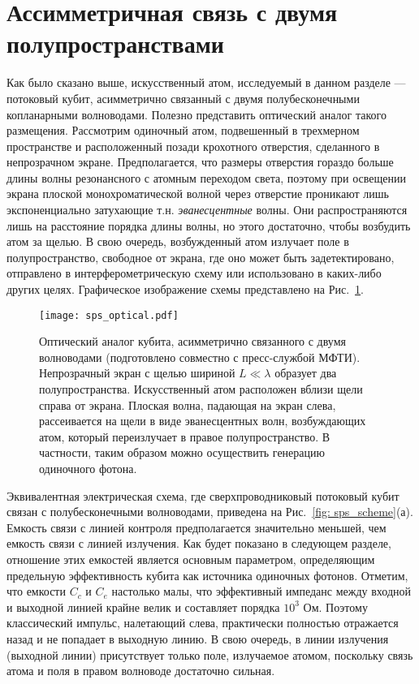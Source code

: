 \section{Ассимметричная связь с двумя полупространствами}
Как было сказано выше, искусственный атом, исследуемый в данном разделе --- потоковый кубит, асимметрично связанный с двумя полубесконечными копланарными волноводами. Полезно представить оптический аналог такого размещения. Рассмотрим одиночный атом, подвешенный в трехмерном пространстве и расположенный позади крохотного отверстия, сделанного в непрозрачном экране. Предполагается, что размеры отверстия гораздо больше длины волны резонансного с атомным переходом света, поэтому при освещении экрана плоской монохроматической волной через отверстие проникают лишь экспоненциально затухающие т.н. \textit{эванесцентные} волны. Они распространяются лишь на расстояние порядка длины волны, но этого достаточно, чтобы возбудить атом за щелью. В свою очередь, возбужденный атом излучает поле в полупространство, свободное от экрана, где оно может быть задетектировано, отправлено в интерферометрическую схему или использовано в каких-либо других целях. Графическое изображение схемы представлено на Рис.~\ref{fig: hole}. 
\begin{figure}
	\centering
	\texttt{[image: sps\_optical.pdf]}
	\caption[Оптический аналог кубита, связанного с двумя полупространствами асимметричным образом]{Оптический аналог кубита, асимметрично связанного с двумя волноводами (подготовлено совместно с пресс-службой МФТИ). Непрозрачный экран с щелью шириной $L \ll \lambda$ образует два полупространства. Искусственный атом расположен вблизи щели справа от экрана. Плоская волна, падающая на экран слева, рассеивается на щели в виде эванесцентных волн, возбуждающих атом, который переизлучает в правое полупространство. В частности, таким образом можно осуществить генерацию одиночного фотона.}
	\label{fig: hole}
\end{figure}
Эквивалентная электрическая схема, где сверхпроводниковый потоковый кубит связан с полубесконечными волноводами, приведена на Рис.~\ref{fig: sps_scheme}(а). Емкость связи с линией контроля предполагается значительно меньшей, чем емкость связи с линией излучения. Как будет показано в следующем разделе, отношение этих емкостей является основным параметром, определяющим предельную эффективность кубита как источника одиночных фотонов. Отметим, что емкости $C_c$ и $C_e$ настолько малы, что эффективный импеданс между входной и выходной линией крайне велик и составляет порядка $10^3$ Ом. Поэтому классический импульс, налетающий слева, практически полностью отражается назад и не попадает в выходную линию. В свою очередь, в линии излучения (выходной линии) присутствует только поле, излучаемое атомом, поскольку связь атома и поля в правом волноводе достаточно сильная. 
